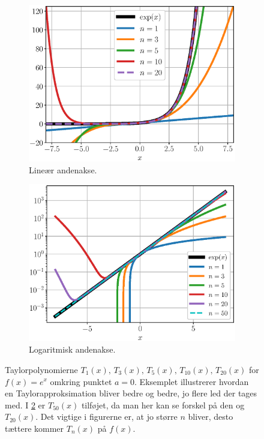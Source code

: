 %
\begin{figure}[t]
	\centering
	\begin{subfigure}{.475\textwidth}
	    \centering
    	\includegraphics[width=\columnwidth]{Matematik/matfig/taylor.eps}
    	\caption{Lineær andenakse.}
    	\label{mat:eq:taylor_lin}
    \end{subfigure}
    \hfill
	\begin{subfigure}{.475\textwidth}
	    \centering
    	\includegraphics[width=\columnwidth]{Matematik/matfig/taylor_log.eps}
    	\caption{Logaritmisk andenakse.}
    	\label{mat:eq:taylor_log}
    \end{subfigure}
	\caption{Taylorpolynomierne $T_1(x), \, T_3(x), \, T_5(x), \,T_{10}(x), \, T_{20}(x)$ for $f(x) = e^x$ omkring punktet $a=0$. Eksemplet illustrerer hvordan en Taylorapproksimation bliver bedre og bedre, jo flere led der tages med. I \cref{mat:eq:taylor_log} er $T_{50}(x)$ tilføjet, da man her kan se forskel på den og $T_{20}(x)$. Det vigtige i figurerne er, at jo større $n$ bliver, desto tættere kommer $T_n(x)$ på $f(x)$.}
	\label{mat:fig:Taylorseries_figure}
\end{figure}
